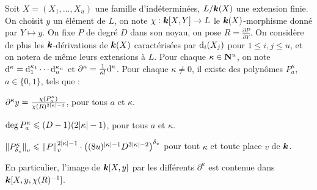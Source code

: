 \begin{lem}
  Soit $X = (X_1, \dots, X_u)$ une famille d'indéterminées, $L / \boldsymbol{k}(X)$ une
  extension finie. On choisit $y$ un élément de $L$, on note $\chi : \boldsymbol{k}[X, Y]
  \to L$ le $\boldsymbol{k}(X)$-morphisme donné par $Y \mapsto y$. On fixe $P$ de degré
  $D$ dans son noyau, on pose $R = \frac{\partial P}{\partial Y}$. On considère
  de plus les $\boldsymbol{k}$-dérivations de $\boldsymbol{k}(X)$ caractérisées par $\mathrm d_i(X_j)$
  pour $1 \le i, j \le u$, et on notera de même leurs extensions à $L$. Pour
  chaque $\kappa \in \mathbf{N}^u$, on note $\mathrm d^\kappa = \mathrm d_1^{\kappa_1}\cdots
  \mathrm d_u^{\kappa_u}$ et $\partial^\kappa = \frac1{\kappa!}\mathrm d^\kappa$. Pour
  chaque $\kappa \neq 0$, il existe des polynômes $P_a^\kappa$, $a \in \{0,
  1\}$, tels que :
  \begin{enumthm}
    \item $\partial^\kappa y =
      \frac{\chi(P_a^\kappa)}{\chi(R)^{2{\lvert\kappa\rvert}-1}}$, \label{i-repres}
      pour tous $a$ et $\kappa$.
    \item $\deg P_a^\kappa \leqslant (D -1)(2 {\lvert\kappa\rvert} -1)$,
      pour tous $a$ et $\kappa$.
    \item $\left\lVert P_{\delta\smash{_v}}^{\kappa}\right\rVert_{v} \leqslant \left\lVert P\right\rVert_{v} ^{2{\lvert\kappa\rvert} - 1}
      \cdot \left((8u)^{{\lvert\kappa\rvert} -1} D^{3{\lvert\kappa\rvert} -2} \right)^{\delta\smash{_v}}$
      pour tout $\kappa$ et toute place $v$ de $\boldsymbol{k}$.
  \end{enumthm}
  En particulier, l'image de $\boldsymbol{k}[X, y]$ par les différents $\partial^\kappa$
  est contenue dans $\boldsymbol{k}[X, y, \chi(R)^{-1}]$.
\end{lem}

